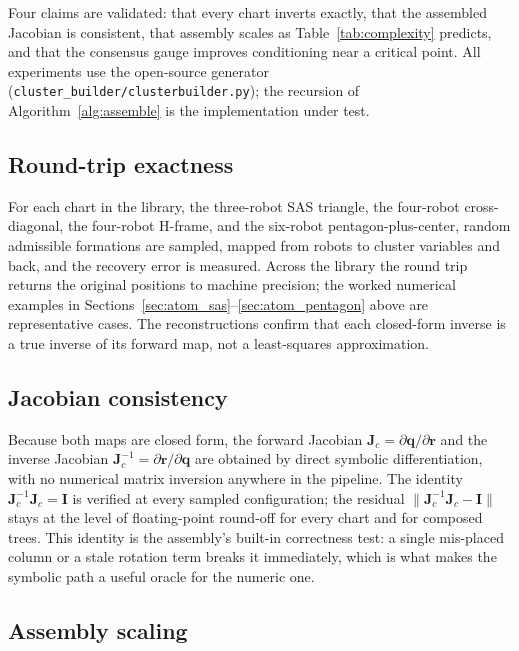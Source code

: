 \documentclass[12pt, letterpaper, oneside]{report}
\begin{document}
Four claims are validated: that every chart inverts exactly, that the
assembled Jacobian is consistent, that assembly scales as
Table~\ref{tab:complexity} predicts, and that the consensus gauge improves
conditioning near a critical point. All experiments use the open-source
generator (\texttt{cluster\_builder/clusterbuilder.py}); the recursion of
Algorithm~\ref{alg:assemble} is the implementation under test.

\subsection{Round-trip exactness}

For each chart in the library, the three-robot SAS triangle, the four-robot
cross-diagonal, the four-robot H-frame, and the six-robot
pentagon-plus-center, random admissible formations are sampled, mapped from
robots to cluster variables and back, and the recovery error is measured.
Across the library the round trip returns the original positions to
machine precision; the worked numerical examples in
Sections~\ref{sec:atom_sas}--\ref{sec:atom_pentagon} above are representative
cases. The reconstructions confirm that each closed-form inverse is a true
inverse of its forward map, not a least-squares approximation.

\subsection{Jacobian consistency}

Because both maps are closed form, the forward Jacobian
$\mathbf{J}_c=\partial\mathbf{q}/\partial\mathbf{r}$ and the inverse
Jacobian $\mathbf{J}_c^{-1}=\partial\mathbf{r}/\partial\mathbf{q}$ are
obtained by direct symbolic differentiation, with no numerical matrix
inversion anywhere in the pipeline. The identity
$\mathbf{J}_c^{-1}\mathbf{J}_c=\mathbf{I}$ is verified at every sampled
configuration; the residual $\lVert \mathbf{J}_c^{-1}\mathbf{J}_c-\mathbf{I}\rVert$
stays at the level of floating-point round-off for every chart and for
composed trees. This identity is the assembly's built-in correctness test:
a single mis-placed column or a stale rotation term breaks it immediately,
which is what makes the symbolic path a useful oracle for the numeric one.

\subsection{Assembly scaling}
\end{document}
